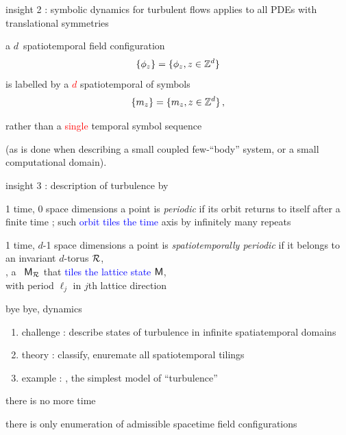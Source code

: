 \begin{frame}{insight 2 : symbolic dynamics for turbulent flows}
applies to
all PDEs with translational symmetries

\bigskip

a $d$\dmn\ spatiotemporal field configuration
\[
\{\phi_{z}\} = \{\phi_{z},  z\in \mathbb{Z}^{d}  \}
\]
is labelled by a \textcolor{red}{$d$\dmn} {spatiotemporal
{\brick}} of symbols
\[
\{m_{z}\} = \{m_{z}, z\in \mathbb{Z}^{d}\}
\,,
\]

\bigskip

rather than a \textcolor{red}{single} temporal symbol sequence

\bigskip

(as is done when describing a small coupled few-``body'' system, or a
small computational domain).
\end{frame}

\begin{frame}{insight 3 : description of turbulence by \twots}
\begin{block}{1 time, 0 space dimensions}
a {\statesp} point is {\em periodic} if its orbit returns to itself
after a finite time \period{}; such \textcolor{blue}{orbit tiles the time} axis
by infinitely many repeats
\end{block}

\bigskip

\begin{block}{1 time, $d$-1 space dimensions}
 a {\statesp} point is {\em spatiotemporally periodic} if
it belongs to \\ an invariant $d$-torus ${\mathcal{R}}$,\\
\ie, a \brick\ $\mathsf{M}_{\mathcal{R}}$ that
\textcolor{blue}{tiles the lattice state}  $\mathsf{M}$, \\
with period $\ell_j$ in $j$th lattice direction
\end{block}
\end{frame}

\begin{frame}{bye bye, dynamics}
\begin{enumerate}
              \item
challenge : describe states of turbulence in infinite spatiatemporal domains
              \item
theory : classify, enuremate all spatiotemporal tilings
              \item
example : \catlatt, the simplest model of ``turbulence''
\end{enumerate}

\vfill

there is no more time

\medskip

there is only enumeration of admissible spacetime field configurations
\end{frame}

